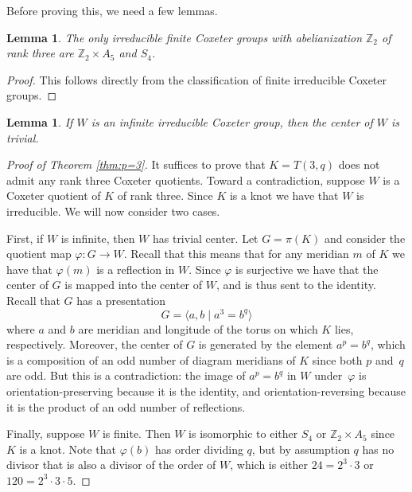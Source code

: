\documentclass{article}
\newtheorem{lemma}[theorem]{Lemma}
\theoremstyle{definition}
\begin{document}
Before proving this, we need a few lemmas.

\begin{lemma}
The only irreducible finite Coxeter groups with abelianization $\mathbb{Z}_2$ of rank three are $\mathbb{Z}_2 \times A_5$ and $S_4$.
\end{lemma}

\begin{proof}
This follows directly from the classification of finite irreducible Coxeter groups.
\end{proof}

\begin{lemma}
If $W$ is an infinite irreducible Coxeter group, then the center of $W$ is trivial.
\end{lemma}


\begin{proof}[Proof of Theorem \ref{thm:p=3}]
It suffices to prove that $K = T(3, q)$ does not admit any rank three Coxeter quotients. Toward a contradiction, suppose $W$ is a Coxeter quotient of $K$ of rank three. Since $K$ is a knot we have that $W$ is irreducible. We will now consider two cases.

First, if $W$ is infinite, then $W$ has trivial center. Let $G = \pi(K)$ and consider the quotient map $\varphi: G \rightarrow W$. Recall that this means that for any meridian $m$ of $K$ we have that $\varphi(m)$ is a reflection in $W$. Since $\varphi$ is surjective we have that the center of $G$ is mapped into the center of $W$, and is thus sent to the identity. Recall that $G$ has a presentation
$$G = \langle a, b \; | \; a^3 = b^q \rangle$$
where $a$ and $b$ are meridian and longitude of the torus on which $K$ lies, respectively. Moreover, the center of $G$ is generated by the element $a^p = b^q$, which is a composition of an odd number of diagram meridians of $K$ since both $p$ and~$q$ are odd. But this is a contradiction: the image of $a^p = b^q$ in $W$ under~$\varphi$ is orientation-preserving because it is the identity, and orientation-reversing because it is the product of an odd number of reflections.

Finally, suppose $W$ is finite. Then $W$ is isomorphic to either $S_4$ or $\mathbb{Z}_2 \times A_5$ since $K$ is a knot. Note that $\varphi(b)$ has order dividing $q$, but by assumption $q$ has no divisor that is also a divisor of the order of $W$, which is either $24 = 2^3 \cdot 3$ or $120 = 2^3 \cdot 3 \cdot 5$.
\end{proof}
\end{document}
